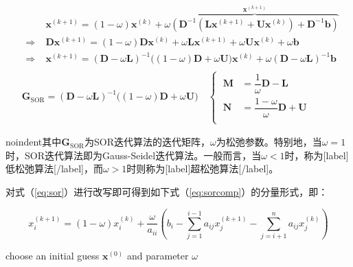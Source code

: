 \documentclass[12pt, UTF8, nofonts]{ctexart}
\begin{document}
\begin{eqnarray}
    \label{eq:sor}
    & \begin{aligned}
        & \boldsymbol{x}^{(k+1)} = (1-\omega)\boldsymbol{x}^{(k)} + \omega\overbrace{\left(\boldsymbol{D}^{-1}(\boldsymbol{L}\boldsymbol{x}^{(k+1)} + \boldsymbol{U}\boldsymbol{x}^{(k)}) + \boldsymbol{D}^{-1}\boldsymbol{b}\right)}^{\boldsymbol{x}^{(k+1)}} \\
        \Rightarrow \;& \boldsymbol{D}\boldsymbol{x}^{(k+1)} = (1-\omega)\boldsymbol{D}\boldsymbol{x}^{(k)} + \omega\boldsymbol{L}\boldsymbol{x}^{(k+1)} + \omega\boldsymbol{U}\boldsymbol{x}^{(k)} + \omega\boldsymbol{b} \\
        \Rightarrow \;& \boldsymbol{x}^{(k+1)} = (\boldsymbol{D}-\omega\boldsymbol{L})^{-1}\Big((1-\omega)\boldsymbol{D}+\omega\boldsymbol{U}\Big)\boldsymbol{x}^{(k)} + \omega(\boldsymbol{D}-\omega\boldsymbol{L})^{-1}\boldsymbol{b}
    \end{aligned} \\
    & \boldsymbol{G}_{\mathrm{SOR}} = (\boldsymbol{D}-\omega\boldsymbol{L})^{-1}\Big((1-\omega)\boldsymbol{D}+\omega\boldsymbol{U}\Big) \quad
    \left\{\;\begin{aligned}
        \boldsymbol{M} &=
        \dfrac{1}{\omega}\boldsymbol{D}-\boldsymbol{L} \\
        \boldsymbol{N} &=
        \dfrac{1-\omega}{\omega}\boldsymbol{D}+\boldsymbol{U} \\
    \end{aligned}\right.
\end{eqnarray}

noindent其中$\boldsymbol{G}_{\mathrm{SOR}}$为SOR迭代算法的迭代矩阵，$\omega$为松弛参数。特别地，当$\omega=1$时，SOR迭代算法即为Gauss-Seidel迭代算法。一般而言，当$\omega<1$时，称为[label]低松弛算法[/label]，而$\omega>1$时则称为[label]超松弛算法[/label]。

对式（\ref{eq:sor}）进行改写即可得到如下式（\ref{eq:sorcomp}）的分量形式，即：

\begin{equation}
    \label{eq:sorcomp}
    x_{i}^{(k+1)} = (1-\omega)x_{i}^{(k)} + \dfrac{\omega}{a_{ii}} \left(b_i-\sum_{j=1}^{i-1}a_{ij}x_j^{(k+1)}-\sum_{j=i+1}^na_{ij}x_{j}^{(k)}\right)
\end{equation}

\begin{algorithm}[H]
    choose an initial guess $\boldsymbol{x}^{(0)}$ and parameter $\omega$ \;
\end{algorithm}
\end{document}
